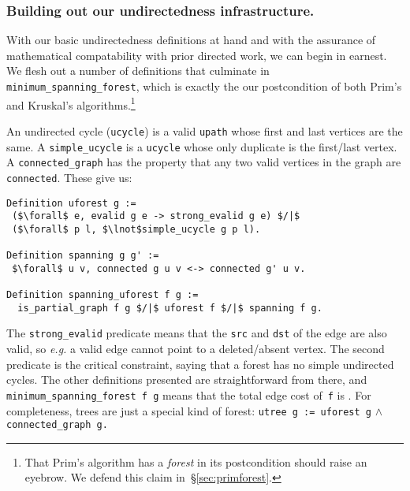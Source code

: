 \subsubsection{Building out our undirectedness infrastructure.}
With our basic undirectedness definitions at hand and with the assurance
of mathematical compatability with prior directed work, we can begin in 
earnest. We flesh out a number of definitions that culminate in 
\texttt{minimum\_spanning\_forest}, which is exactly the our postcondition
of both Prim's and Kruskal's algorithms.\footnote{That Prim's algorithm has
a \emph{forest} in its postcondition should raise an eyebrow. We defend this claim
in~\S\ref{sec:primforest}.}

An undirected cycle (\texttt{ucycle}) is a valid \texttt{upath} whose first 
and last vertices are the same.  A \texttt{simple\_ucycle} is a \texttt{ucycle} whose
only duplicate is the first/last vertex. A \texttt{connected\_graph}
has the property that any two valid vertices in the graph are \texttt{connected}.
These give us:
\lstset{style=CoqStyle}
\begin{lstlisting}
Definition uforest g := 
 ($\forall$ e, evalid g e -> strong_evalid g e) $/|$
 ($\forall$ p l, $\lnot$simple_ucycle g p l).

Definition spanning g g' := 
 $\forall$ u v, connected g u v <-> connected g' u v.

Definition spanning_uforest f g :=
  is_partial_graph f g $/|$ uforest f $/|$ spanning f g. 
\end{lstlisting}
The \texttt{strong\_evalid} predicate means that the 
\texttt{src} and \texttt{dst} of the edge are also valid, so
\emph{e.g.} a valid edge cannot point to a deleted/absent vertex.
The second predicate is the critical constraint, saying that a
forest has no simple undirected cycles. The other definitions presented
are straightforward from there, and 
\texttt{minimum\_spanning\_forest f g} means that the total edge cost 
of~\texttt{f} is .
For completeness, trees are just a special kind of forest:
\texttt{utree~g~:= uforest~g} $\wedge$ \texttt{connected\_graph~g.}



